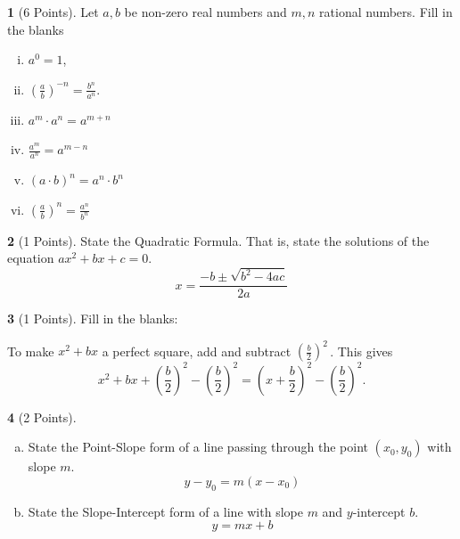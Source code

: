 \documentclass[12pt]{amsart}
\theoremstyle{definition}
\newtheorem{thm}{}
\theoremstyle{definition}
\begin{document}
\begin{thm}[6 Points]\label{ex2}
  Let $a, b$ be non-zero real numbers and $m, n$ rational numbers.
  Fill in the blanks
  \begin{multicols}{2}
    \begin{enumerate}[(i)]
    \item
      $\displaystyle{a^0 = 1}$,
      \vspace{.15in}
    \item
      $\displaystyle{\left(\frac{a}{b}\right)^{-n} = \frac{b^n}{a^n}}.$
      \vspace{.15in}
    \item
      $\displaystyle{a^m \cdot a^n = a^{m+n}}$
      \vspace{.15in}
    \item
      $\displaystyle{\frac{a^m}{a^n} = a^{m-n}}$
      \vspace{.15in}
    \item
      $\displaystyle{\left(a \cdot b\right)^n = a^n\cdot b^n}$
      \vspace{.15in}
    \item
      $\displaystyle{\left(\frac{a}{b}\right)^n = \frac{a^n}{b^n}}$
    \end{enumerate}
  \end{multicols}
\end{thm}

\begin{thm}[1 Points]\label{ex3}
  State the Quadratic Formula.
  That is, state the solutions of the equation $ax^2 + bx + c = 0$.
  $$x = \frac{-b \pm \sqrt{b^2 - 4ac}}{2a}$$
\end{thm}

\begin{thm}[1 Points]\label{ex4}
  Fill in the blanks:\\
  \begin{center}
    To make $x^2 + bx$ a perfect square, add and subtract $\left(\frac{b}{2}\right)^2$\,.
    This gives
    $$x^2 + bx + \left(\frac{b}{2}\right)^2 - \left(\frac{b}{2}\right)^2 = \left(x + \frac{b}{2}\right)^2 - \left(\frac{b}{2}\right)^2.$$
  \end{center}
\end{thm}

\begin{thm}[2 Points]\label{ex1}
  \begin{enumerate}[(a)]
  \item
    State the Point-Slope form of a line passing through the point $(x_0, y_0)$ with slope $m$.
    $$y - y_0 = m(x - x_0)$$
  \item
    State the Slope-Intercept form of a line with slope $m$ and $y$-intercept $b$.
    $$y = mx + b$$
  \end{enumerate}
\end{thm}
\newpage
\end{document}
